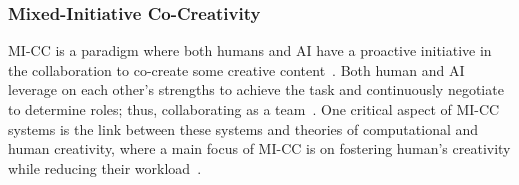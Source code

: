 






\subsubsection{Mixed-Initiative Co-Creativity}


MI-CC is a paradigm where both humans and AI have a proactive initiative in the collaboration to co-create some creative content~. Both human and AI leverage on each other's strengths to achieve the task and continuously negotiate to determine roles; thus, collaborating as a team~. One critical aspect of MI-CC systems is the link between these systems and theories of computational and human creativity, where a main focus of MI-CC is on fostering human's creativity while reducing their workload~.

